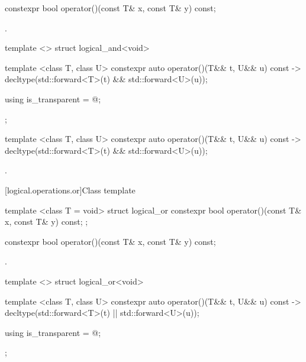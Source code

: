 %
\begin{itemdecl}
constexpr bool operator()(const T& x, const T& y) const;
\end{itemdecl}

\begin{itemdescr}
\pnum\returns {}.
\end{itemdescr}

%
\begin{itemdecl}
template <> struct logical_and<void> {
  template <class T, class U> constexpr auto operator()(T&& t, U&& u) const
    -> decltype(std::forward<T>(t) && std::forward<U>(u));

  using is_transparent = @\unspec@;
};
\end{itemdecl}

%
\begin{itemdecl}
template <class T, class U> constexpr auto operator()(T&& t, U&& u) const
    -> decltype(std::forward<T>(t) && std::forward<U>(u));
\end{itemdecl}

\begin{itemdescr}
\pnum\returns {}.
\end{itemdescr}

[logical.operations.or]{Class template }

%
\begin{itemdecl}
template <class T = void> struct logical_or {
  constexpr bool operator()(const T& x, const T& y) const;
};
\end{itemdecl}

%
\begin{itemdecl}
constexpr bool operator()(const T& x, const T& y) const;
\end{itemdecl}

\begin{itemdescr}
\pnum\returns {}.
\end{itemdescr}

%
\begin{itemdecl}
template <> struct logical_or<void> {
  template <class T, class U> constexpr auto operator()(T&& t, U&& u) const
    -> decltype(std::forward<T>(t) || std::forward<U>(u));

  using is_transparent = @\unspec@;
};
\end{itemdecl}

